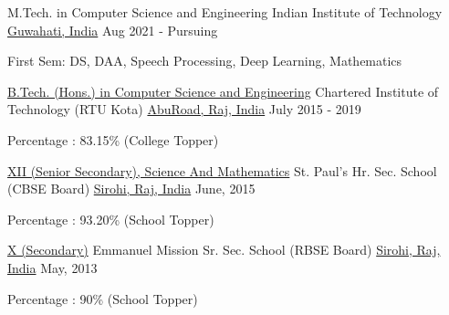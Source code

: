 
\begin{cventries}
 \cventry
    {M.Tech. in Computer Science and Engineering}
    {Indian Institute of Technology }
    {\href{https://www.iitg.ac.in/}{Guwahati, India}}
    {Aug 2021 - Pursuing}
    {
      \begin{cvitems}
        \item {First Sem: DS, DAA, Speech Processing, Deep Learning, Mathematics}
      \end{cvitems}
    }
    
  \cventry
    {\href{https://drive.google.com/file/d/1TFuDlYSC8Mkl6_jJzfSPSUVOl5xZtuPO/view?usp=sharing}{B.Tech. (Hons.) in Computer Science and Engineering}}
    {Chartered Institute of Technology (RTU Kota)}
    {\href{http://citabu.ac.in/}{AbuRoad, Raj, India}}
    {July 2015 - 2019}
    {
      \begin{cvitems}
        \item {Percentage : 83.15\% (College Topper)}
      \end{cvitems}
    }
    
  \cventry
    {\href{https://drive.google.com/file/d/1Mdz6xIooyFB_06LaT7mBtSxOFnBv12cy/view?usp=sharing}{XII (Senior Secondary), Science And Mathematics}}
    {St. Paul's Hr. Sec. School (CBSE Board)}
    {\href{http://stpaulsschoolsirohi.com/}{Sirohi, Raj, India}}
    {June, 2015}
    {
      \begin{cvitems}
        \item {Percentage : 93.20\% (School Topper)}
      \end{cvitems}
    }
    
  \cventry
    {\href{https://drive.google.com/file/d/1Ck5ED51H42FCNsS31gej9aTvpquPueqb/view?usp=sharing}{X (Secondary)} }
    {Emmanuel Mission Sr. Sec. School (RBSE Board)}
    {\href{http://www.emmanuelsirohi.com/}{Sirohi, Raj, India}}
    {May, 2013}
    {
      \begin{cvitems}
        \item {Percentage : 90\% (School Topper)}
      \end{cvitems}
    }

\end{cventries}
